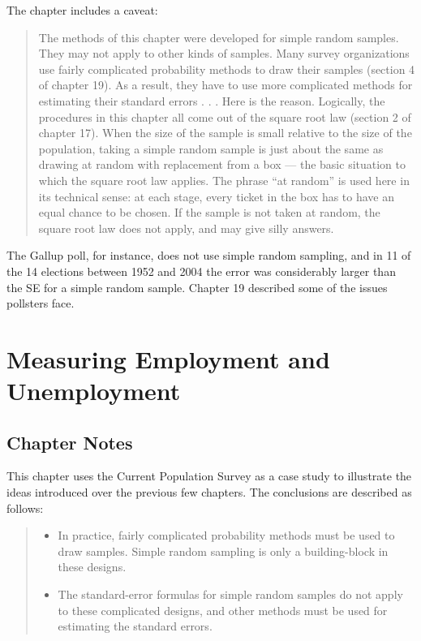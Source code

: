 \documentclass[
]{book}
\providecommand{\tightlist}{%
  \setlength{\itemsep}{0pt}\setlength{\parskip}{0pt}}
\begin{document}
The chapter includes a caveat:

\begin{quote}
The methods of this chapter were developed for simple random samples. They may not apply to other kinds of samples. Many survey organizations use fairly complicated probability methods to draw their samples (section 4 of chapter 19). As a result, they have to use more complicated methods for estimating
their standard errors . . . Here is the reason. Logically, the procedures in this chapter all come out of the square root law (section 2 of chapter 17). When the size of the sample is small relative to the size of the population, taking a simple random sample is just about the same as drawing at random with replacement from a box --- the basic situation to which the square root law applies. The phrase ``at random'' is used here in its technical sense: at each stage, every ticket in the box has to have an equal chance to be chosen. If the sample is not taken at random, the square root law does not apply, and may give silly answers.
\end{quote}

The Gallup poll, for instance, does not use simple random sampling, and in 11 of the 14 elections between 1952 and 2004 the error was considerably larger than the SE for a simple random sample. Chapter 19 described some of the issues pollsters face.

\hypertarget{measuring_employment}{%
\chapter{Measuring Employment and Unemployment}\label{measuring_employment}}

\hypertarget{chapter-notes-21}{%
\section{Chapter Notes}\label{chapter-notes-21}}

This chapter uses the Current Population Survey as a case study to illustrate the ideas introduced over the previous few chapters. The conclusions are described as follows:

\begin{quote}
\begin{itemize}
\tightlist
\item
  In practice, fairly complicated probability methods must be used to draw samples. Simple random sampling is only a building-block in these designs.
\item
  The standard-error formulas for simple random samples do not apply to these complicated designs, and other methods must be used for estimating the standard errors.
\end{itemize}
\end{quote}
\end{document}
